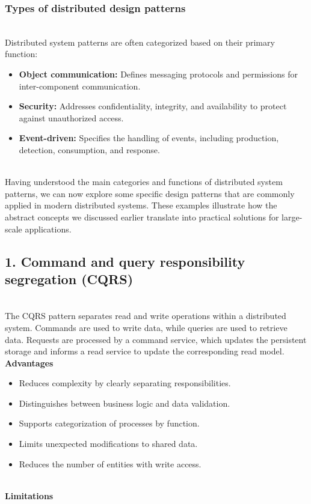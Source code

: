 \subsubsection{Types of distributed design patterns}\label{sfbv-4lo9k0Zt2zbdJi2b}
\\
Distributed system patterns are often categorized based on their primary function:

\begin{itemize}
\item
\protect{}\label{8yjKglgSZdm9XKlrxM7MZ}
\textbf{Object communication:} Defines messaging protocols and permissions for inter-component communication.
\item
\protect{}\label{NfY8icELL28e8s6RmDwlW}
\textbf{Security:} Addresses confidentiality, integrity, and availability to protect against unauthorized access.
\item
\protect{}\label{7TmULYbchzC4AQVCDGkJE}
\textbf{Event-driven:} Specifies the handling of events, including production, detection, consumption, and response.
\end{itemize}
\\
Having understood the main categories and functions of distributed system patterns, we can now explore some specific design patterns that are commonly applied in modern distributed systems. These examples illustrate how the abstract concepts we discussed earlier translate into practical solutions for large-scale applications.

\subsection{1. Command and query responsibility segregation (CQRS)}\label{FVX4b1OfApDkRM87EyQxH}
\\
The CQRS pattern separates read and write operations within a distributed system. Commands are used to write data, while queries are used to retrieve data. Requests are processed by a command service, which updates the persistent storage and informs a read service to update the corresponding read model.
\\
\textbf{Advantages}

\begin{itemize}
\item
\protect{}\label{zsG7XpTj77yMsYOvbNk82}
Reduces complexity by clearly separating responsibilities.
\item
\protect{}\label{IfCprPrapJrtjoI9jgNK_}
Distinguishes between business logic and data validation.
\item
\protect{}\label{LiKUlsy0LYovsDg0ozoCH}
Supports categorization of processes by function.
\item
\protect{}\label{Dvq23AQB9nLfI3jFIKKgS}
Limits unexpected modifications to shared data.
\item
\protect{}\label{onTZP847EKitMMs8OOiaZ}
Reduces the number of entities with write access.
\end{itemize}
\\
\textbf{Limitations}

